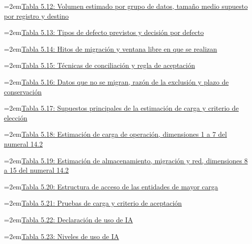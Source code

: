 \documentclass[11pt]{article}
\begin{document}
\noindent\hangindent=2em\hyperref[tab:t17]{Tabla 5.12: Volumen estimado por grupo de datos, tamaño medio supuesto por registro y destino}\dotfill\pageref{tab:t17}\par\vspace{0.4\baselineskip}
\noindent\hangindent=2em\hyperref[tab:t18]{Tabla 5.13: Tipos de defecto previstos y decisión por defecto}\dotfill\pageref{tab:t18}\par\vspace{0.4\baselineskip}
\noindent\hangindent=2em\hyperref[tab:t19]{Tabla 5.14: Hitos de migración y ventana libre en que se realizan}\dotfill\pageref{tab:t19}\par\vspace{0.4\baselineskip}
\noindent\hangindent=2em\hyperref[tab:t20]{Tabla 5.15: Técnicas de conciliación y regla de aceptación}\dotfill\pageref{tab:t20}\par\vspace{0.4\baselineskip}
\noindent\hangindent=2em\hyperref[tab:t21]{Tabla 5.16: Datos que no se migran, razón de la exclusión y plazo de conservación}\dotfill\pageref{tab:t21}\par\vspace{0.4\baselineskip}
\noindent\hangindent=2em\hyperref[tab:t22]{Tabla 5.17: Supuestos principales de la estimación de carga y criterio de elección}\dotfill\pageref{tab:t22}\par\vspace{0.4\baselineskip}
\noindent\hangindent=2em\hyperref[tab:t23]{Tabla 5.18: Estimación de carga de operación, dimensiones 1 a 7 del numeral 14.2}\dotfill\pageref{tab:t23}\par\vspace{0.4\baselineskip}
\noindent\hangindent=2em\hyperref[tab:t24]{Tabla 5.19: Estimación de almacenamiento, migración y red, dimensiones 8 a 15 del numeral 14.2}\dotfill\pageref{tab:t24}\par\vspace{0.4\baselineskip}
\noindent\hangindent=2em\hyperref[tab:t25]{Tabla 5.20: Estructura de acceso de las entidades de mayor carga}\dotfill\pageref{tab:t25}\par\vspace{0.4\baselineskip}
\noindent\hangindent=2em\hyperref[tab:t26]{Tabla 5.21: Pruebas de carga y criterio de aceptación}\dotfill\pageref{tab:t26}\par\vspace{0.4\baselineskip}
\noindent\hangindent=2em\hyperref[tab:ia]{Tabla 5.22: Declaración de uso de IA}\dotfill\pageref{tab:ia}\par\vspace{0.4\baselineskip}
\noindent\hangindent=2em\hyperref[tab:niveles]{Tabla 5.23: Niveles de uso de IA}\dotfill\pageref{tab:niveles}\par\vspace{0.4\baselineskip}
\clearpage
\end{document}
